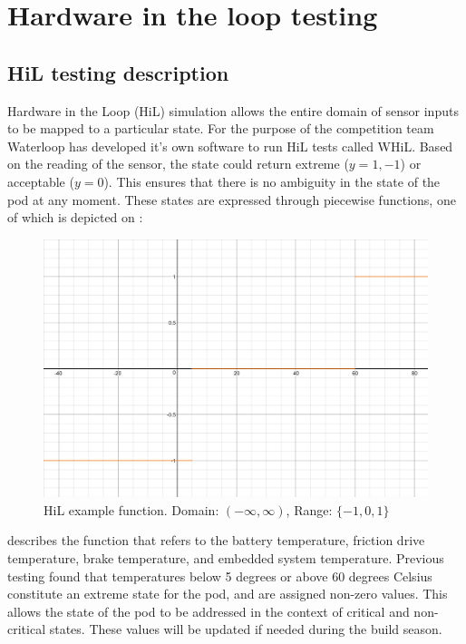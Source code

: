 \documentclass[main.tex]{subfiles}
\begin{document}
   \section{Hardware in the loop testing}
   \subsection{HiL testing description}
   Hardware in the Loop (HiL) simulation allows the entire domain of sensor inputs to be mapped to a particular state. For the purpose of the competition team Waterloop has developed it's own software to run HiL tests called WHiL. Based on the reading of the sensor, the state could return extreme ($y = 1, -1$) or acceptable ($y = 0$). This ensures that there is no ambiguity in the state of the pod at any moment. These states are expressed through piecewise functions, one of which is depicted on :

  \begin{figure}
        \centering
        \includegraphics[width=\textwidth]{images/HiL-example-function.png}
        \caption{HiL example function. Domain: $(-\infty, \infty)$, Range: $\{-1,0,1\}$}
        \label{fig:hil-function}
    \end{figure}

 describes the function that refers to the battery temperature, friction drive temperature, brake temperature, and embedded system temperature.
Previous testing found that temperatures below 5 degrees or above 60 degrees Celsius constitute an extreme state for the pod, and are assigned non-zero values. This allows the state of the pod to be addressed in the context of critical and non-critical states. These values will be updated if needed during the build season.
\end{document}
